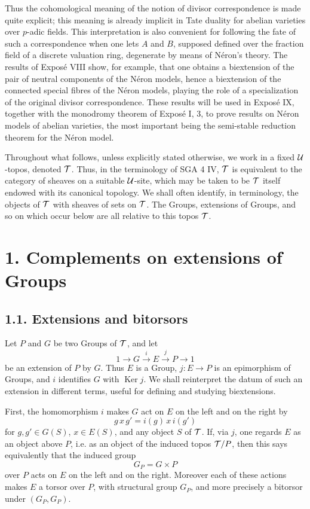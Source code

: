 \documentclass[11pt]{article}
\providecommand{\Ker}{\operatorname{Ker}}
\begin{document}
Thus the cohomological meaning of the notion of divisor correspondence is made quite explicit; this meaning is already implicit in Tate duality for abelian varieties over \(p\)-adic fields.  This interpretation is also convenient for following the fate of such a correspondence when one lets \(A\) and \(B\), supposed defined over the fraction field of a discrete valuation ring, degenerate by means of Néron's theory.  The results of Exposé VIII show, for example, that one obtains a biextension of the pair of neutral components of the Néron models, hence a biextension of the connected special fibres of the Néron models, playing the role of a specialization of the original divisor correspondence.  These results will be used in Exposé IX, together with the monodromy theorem of Exposé I, 3, to prove results on Néron models of abelian varieties, the most important being the semi-stable reduction theorem for the Néron model.

Throughout what follows, unless explicitly stated otherwise, we work in a fixed \(\mathcal U\)-topos, denoted \(\mathcal T\).  Thus, in the terminology of SGA 4 IV, \(\mathcal T\) is equivalent to the category of sheaves on a suitable \(\mathcal U\)-site, which may be taken to be \(\mathcal T\) itself endowed with its canonical topology.  We shall often identify, in terminology, the objects of \(\mathcal T\) with sheaves of sets on \(\mathcal T\).  The Groups, extensions of Groups, and so on which occur below are all relative to this topos \(\mathcal T\).

\section*{1. Complements on extensions of Groups}

\subsection*{1.1. Extensions and bitorsors}

Let \(P\) and \(G\) be two Groups of \(\mathcal T\), and let
\begin{equation}\tag{1.1.1}
  1\longrightarrow G\xrightarrow{i}E\xrightarrow{j}P\longrightarrow 1
\end{equation}
be an extension of \(P\) by \(G\).  Thus \(E\) is a Group, \(j:E\to P\) is an epimorphism of Groups, and \(i\) identifies \(G\) with \(\Ker j\).  We shall reinterpret the datum of such an extension in different terms, useful for defining and studying biextensions.

First, the homomorphism \(i\) makes \(G\) act on \(E\) on the left and on the right by
\[
  g\,x\,g'=i(g)\,x\,i(g')
\]
for \(g,g'\in G(S)\), \(x\in E(S)\), and any object \(S\) of \(\mathcal T\).  If, via \(j\), one regards \(E\) as an object above \(P\), i.e. as an object of the induced topos \(\mathcal T/P\), then this says equivalently that the induced group
\[
  G_P=G\times P
\]
over \(P\) acts on \(E\) on the left and on the right.  Moreover each of these actions makes \(E\) a torsor over \(P\), with structural group \(G_P\), and more precisely a bitorsor under \((G_P,G_P)\).
\end{document}
